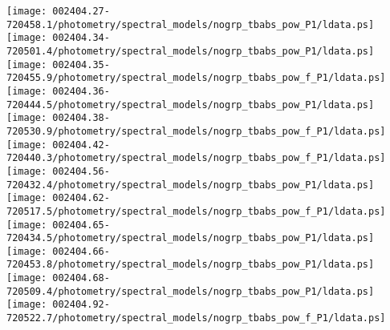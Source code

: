 \documentclass{aastex}
\begin{document}
\begin{figure*}[!ht]
\centering
\texttt{[image: 002404.27-720458.1/photometry/spectral\_models/nogrp\_tbabs\_pow\_P1/ldata.ps]} \hfill 
\texttt{[image: 002404.34-720501.4/photometry/spectral\_models/nogrp\_tbabs\_pow\_P1/ldata.ps]} \hfill 
\texttt{[image: 002404.35-720455.9/photometry/spectral\_models/nogrp\_tbabs\_pow\_f\_P1/ldata.ps]} \\ 
\vspace*{0.5in}
\texttt{[image: 002404.36-720444.5/photometry/spectral\_models/nogrp\_tbabs\_pow\_P1/ldata.ps]} \hfill 
\texttt{[image: 002404.38-720530.9/photometry/spectral\_models/nogrp\_tbabs\_pow\_f\_P1/ldata.ps]} \hfill 
\texttt{[image: 002404.42-720440.3/photometry/spectral\_models/nogrp\_tbabs\_pow\_f\_P1/ldata.ps]} \\ 
\vspace*{0.5in}
\texttt{[image: 002404.56-720432.4/photometry/spectral\_models/nogrp\_tbabs\_pow\_P1/ldata.ps]} \hfill 
\texttt{[image: 002404.62-720517.5/photometry/spectral\_models/nogrp\_tbabs\_pow\_f\_P1/ldata.ps]} \hfill 
\texttt{[image: 002404.65-720434.5/photometry/spectral\_models/nogrp\_tbabs\_pow\_P1/ldata.ps]} \\ 
\vspace*{0.5in}
\texttt{[image: 002404.66-720453.8/photometry/spectral\_models/nogrp\_tbabs\_pow\_P1/ldata.ps]} \hfill 
\texttt{[image: 002404.68-720509.4/photometry/spectral\_models/nogrp\_tbabs\_pow\_P1/ldata.ps]} \hfill 
\texttt{[image: 002404.92-720522.7/photometry/spectral\_models/nogrp\_tbabs\_pow\_f\_P1/ldata.ps]} \\ 
\vspace*{0.5in}
\end{figure*}
\clearpage
\end{document}
